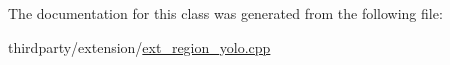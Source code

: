 The documentation for this class was generated from the following file\+:\begin{DoxyCompactItemize}
\item 
thirdparty/extension/\hyperlink{ext__region__yolo_8cpp}{ext\+\_\+region\+\_\+yolo.\+cpp}\end{DoxyCompactItemize}
